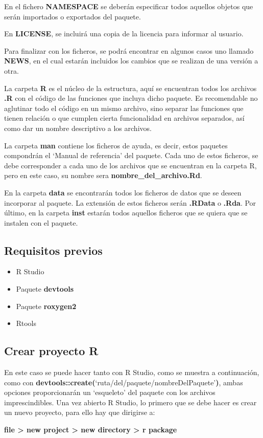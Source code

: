 En el fichero \textbf{NAMESPACE} se deber\'an especificar todos aquellos objetos que ser\'an importados o exportados del paquete.

En \textbf{LICENSE}, se incluir\'a una copia de la licencia para informar al usuario.

Para finalizar con los ficheros, se podr\'a encontrar en algunos casos uno llamado \textbf{NEWS}, en el cual estar\'an 
incluidos los cambios que se realizan de una versi\'on a otra.

La carpeta \textbf{R} es el n\'ucleo de la estructura, aqu\'i se encuentran todos los archivos \textbf{\textbf{.R}} con el c\'odigo de las funciones que incluya dicho paquete.
Es recomendable no aglutinar todo el c\'odigo en un mismo archivo, sino separar las funciones que tienen relaci\'on 
o que cumplen cierta funcionalidad en archivos separados, as\'i como dar un nombre descriptivo a los archivos.

La carpeta \textbf{man} contiene los ficheros de ayuda, es decir, estos paquetes compondr\'an el \enquote*{Manual de referencia} 
del paquete. Cada uno de estos ficheros, se debe corresponder a cada uno de los archivos que se encuentran 
en la carpeta R, pero en este caso, su nombre sera \textbf{nombre\_del\_archivo\textbf{.R}d}.

En la carpeta \textbf{data} se encontrar\'an todos los ficheros de datos que se deseen incorporar al paquete. La extensi\'on 
de estos ficheros ser\'an \textbf{\textbf{.R}Data} o \textbf{\textbf{.R}da}.
Por \'ultimo, en la carpeta \textbf{inst} estar\'an todos aquellos ficheros que se quiera que se instalen con el paquete.
\subsection{Requisitos previos}

\begin{itemize}
    \item R Studio
    \item Paquete \textbf{devtools}
    \item Paquete \textbf{\textbf{roxygen2}} 
    \item Rtools
\end{itemize}

\subsection{Crear proyecto R}

En este caso se puede hacer tanto con R Studio, como se muestra a continuaci\'on,
como con \textbf{devtools::create(}\enquote*{ruta/del/paquete/nombreDelPaquete}\textbf{)}, ambas opciones
proporcionar\'an un \enquote*{esqueleto} del paquete con los archivos imprescindibles.
Una vez abierto R Studio, lo primero que se debe hacer es crear un nuevo proyecto, para ello hay que dirigirse a: 
\begin{center}
    \textbf{file > new project > new directory > r package} 
\end{center}

